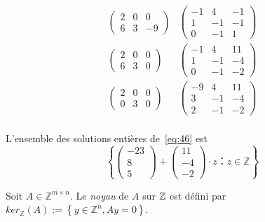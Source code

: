 \begin{example}
\begin{equation}
\begin{array}{cc}
\left(\begin{matrix}2 & 0 & 0\\6 & 3 & -9\end{matrix}\right) &
\left(\begin{matrix}-1 & 4 & -1\\1 & -1 & -1\\0 & -1 & 1\end{matrix}\right)\\

\left(\begin{matrix}2 & 0 & 0\\6 & 3 & 0\end{matrix}\right) &
\left(\begin{matrix}-1 & 4 & 11\\1 & -1 & -4\\0 & -1 & -2\end{matrix}\right)\\


\left(\begin{matrix}2 & 0 & 0\\0 & 3 & 0\end{matrix}\right) &
\left(\begin{matrix}-9 & 4 & 11\\3 & -1 & -4\\2 & -1 & -2\end{matrix}\right)\\
      \end{array}      
    \end{equation}

    L'ensemble des  solutions entières de~\eqref{eq:46} est 
    \begin{displaymath}
      \left\{ \left(\begin{matrix}-23\\8\\5\end{matrix}\right) + \left(\begin{matrix}11\\-4\\-2\end{matrix}\right) ⋅z ： z ∈ℤ\right\}
    \end{displaymath}
    
  \end{example}
  
  \begin{definition}
   \label{def:51}
   Soit $A \in \mathbb{Z}^{m \times n}$. Le \emph{noyau} de $A$ sur $\mathbb{Z}$ est défini par $ker_{\mathbb{Z}}(A) := \left\{ y \in \mathbb{Z}^n, Ay=0 \right\}  $.
  \end{definition}
  

